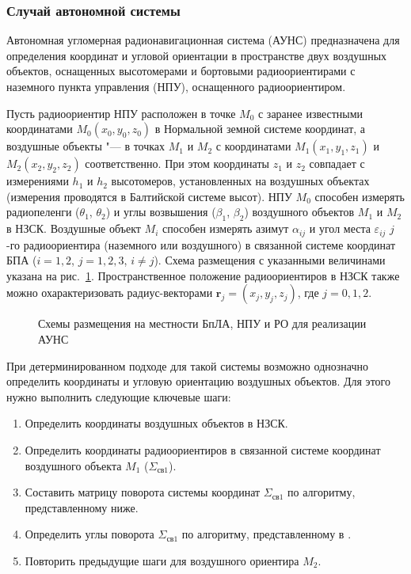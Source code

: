 \documentclass[../main.tex]{subfiles}
\begin{document}
\subsubsection{Случай автономной системы}
Автономная угломерная радионавигационная система (АУНС) предназначена для определения координат и угловой ориентации в пространстве двух воздушных объектов, оснащенных высотомерами и бортовыми радиоориентирами с наземного пункта управления (НПУ), оснащенного радиоориентиром.

Пусть радиоориентир НПУ расположен в точке $M_0$ с заранее известными координатами $M_0\left(x_0, y_0, z_0\right)$ в Нормальной земной системе координат, а воздушные объекты "--- в точках $M_1$ и $M_2$ с координатами $M_1\left(x_1, y_1, z_1\right)$ и $M_2\left(x_2, y_2, z_2\right)$ соответственно. При этом координаты $z_1$ и $z_2$ совпадает с измерениями $h_1$ и $h_2$ высотомеров, установленных на воздушных объектах (измерения проводятся в Балтийской системе высот). НПУ $M_0$ способен измерять радиопеленги ($\theta_1$, $\theta_2$) и углы возвышения ($\beta_1$, $\beta_2$) воздушного объектов $M_1$ и $M_2$ в НЗСК. Воздушные объект $M_i$ способен измерять азимут $\alpha_{ij}$ и угол места $\varepsilon_{ij}$ $j$-го радиоориентира (наземного или воздушного) в связанной системе координат БПА ($i = 1,2$, $j = 1,2,3$, $i \ne j$). Схема размещения с указанными величинами указана на рис.~\ref{fig:systems:pic3}. Пространственное положение радиоориентиров в НЗСК также можно охарактеризовать радиус-векторами $\mathbf{r}_j = \left(x_j, y_j, z_j\right)$, где $j = 0,1,2$.

\begin{figure}[htbp]
    \begin{center}


    \caption{Схемы размещения на местности БпЛА, НПУ и РО для реализации АУНС}
    \label{fig:systems:pic3}
    \end{center}
\end{figure}

При детерминированном подходе для такой системы возможно однозначно определить координаты и угловую ориентацию воздушных объектов. Для этого нужно выполнить следующие ключевые шаги:
\begin{enumerate}
    \item Определить координаты воздушных объектов в НЗСК.
    \item Определить координаты радиоориентиров в связанной системе координат воздушного объекта $M_1$ ($\Sigma_{\text{св}1}$).
    \item Составить матрицу поворота системы координат $\Sigma_{\text{св}1}$ по алгоритму, представленному ниже.
    \item Определить углы поворота $\Sigma_{\text{св}1}$ по алгоритму, представленному в \cite{WMMU:2019:IIS}.
    \item Повторить предыдущие шаги для воздушного ориентира $M_2$.
\end{enumerate}
\end{document}
